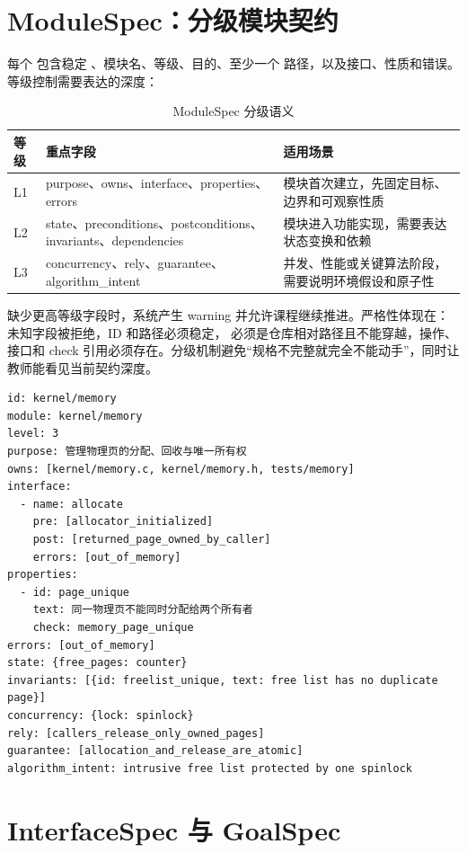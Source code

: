 \section{ModuleSpec：分级模块契约}

每个  包含稳定 、模块名、等级、目的、至少一个  路径，以及接口、性质和错误。等级控制需要表达的深度：

\begin{table}[htbp]
  \centering
  \caption{ModuleSpec 分级语义}
  \begin{tabularx}{\textwidth}{p{2cm}p{4cm}X}
    \toprule
    等级 & 重点字段 & 适用场景 \\
    \midrule
    L1 & purpose、owns、interface、properties、errors & 模块首次建立，先固定目标、边界和可观察性质 \\
    L2 & state、preconditions、postconditions、invariants、dependencies & 模块进入功能实现，需要表达状态变换和依赖 \\
    L3 & concurrency、rely、guarantee、algorithm\_intent & 并发、性能或关键算法阶段，需要说明环境假设和原子性 \\
    \bottomrule
  \end{tabularx}
\end{table}

缺少更高等级字段时，系统产生 warning 并允许课程继续推进。严格性体现在：未知字段被拒绝，ID 和路径必须稳定， 必须是仓库相对路径且不能穿越，操作、接口和 check 引用必须存在。分级机制避免``规格不完整就完全不能动手''，同时让教师能看见当前契约深度。

\begin{lstlisting}[language={},caption={ModuleSpec 示例}]
id: kernel/memory
module: kernel/memory
level: 3
purpose: 管理物理页的分配、回收与唯一所有权
owns: [kernel/memory.c, kernel/memory.h, tests/memory]
interface:
  - name: allocate
    pre: [allocator_initialized]
    post: [returned_page_owned_by_caller]
    errors: [out_of_memory]
properties:
  - id: page_unique
    text: 同一物理页不能同时分配给两个所有者
    check: memory_page_unique
errors: [out_of_memory]
state: {free_pages: counter}
invariants: [{id: freelist_unique, text: free list has no duplicate page}]
concurrency: {lock: spinlock}
rely: [callers_release_only_owned_pages]
guarantee: [allocation_and_release_are_atomic]
algorithm_intent: intrusive free list protected by one spinlock
\end{lstlisting}

\section{InterfaceSpec 与 GoalSpec}


